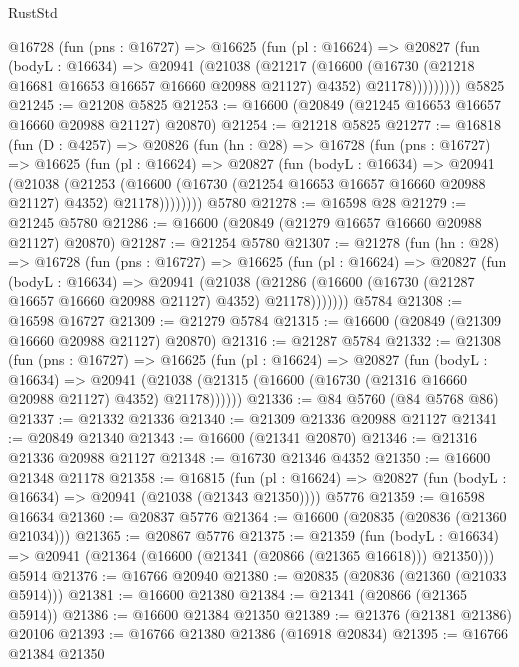 \begin{lexlean}{RustStd}
\begin{coremodule}
        @16728
          (fun (pns : @16727) =>
          @16625
            (fun (pl : @16624) =>
            @20827
              (fun (bodyL : @16634) =>
              @20941
                (@21038
                  (@21217
                    (@16600
                      (@16730 (@21218 @16681 @16653 @16657 @16660 @20988 @21127) @4352)
                      @21178)))))))))
    @5825
@21245 := @21208 @5825
@21253 := @16600 (@20849 (@21245 @16653 @16657 @16660 @20988 @21127) @20870)
@21254 := @21218 @5825
@21277 := @16818
    (fun (D : @4257) =>
    @20826
      (fun (hn : @28) =>
      @16728
        (fun (pns : @16727) =>
        @16625
          (fun (pl : @16624) =>
          @20827
            (fun (bodyL : @16634) =>
            @20941
              (@21038
                (@21253
                  (@16600 (@16730 (@21254 @16653 @16657 @16660 @20988 @21127) @4352) @21178))))))))
    @5780
@21278 := @16598 @28
@21279 := @21245 @5780
@21286 := @16600 (@20849 (@21279 @16657 @16660 @20988 @21127) @20870)
@21287 := @21254 @5780
@21307 := @21278
    (fun (hn : @28) =>
    @16728
      (fun (pns : @16727) =>
      @16625
        (fun (pl : @16624) =>
        @20827
          (fun (bodyL : @16634) =>
          @20941
            (@21038
              (@21286 (@16600 (@16730 (@21287 @16657 @16660 @20988 @21127) @4352) @21178)))))))
    @5784
@21308 := @16598 @16727
@21309 := @21279 @5784
@21315 := @16600 (@20849 (@21309 @16660 @20988 @21127) @20870)
@21316 := @21287 @5784
@21332 := @21308
    (fun (pns : @16727) =>
    @16625
      (fun (pl : @16624) =>
      @20827
        (fun (bodyL : @16634) =>
        @20941 (@21038 (@21315 (@16600 (@16730 (@21316 @16660 @20988 @21127) @4352) @21178))))))
@21336 := @84 @5760 (@84 @5768 @86)
@21337 := @21332 @21336
@21340 := @21309 @21336 @20988 @21127
@21341 := @20849 @21340
@21343 := @16600 (@21341 @20870)
@21346 := @21316 @21336 @20988 @21127
@21348 := @16730 @21346 @4352
@21350 := @16600 @21348 @21178
@21358 := @16815
    (fun (pl : @16624) => @20827 (fun (bodyL : @16634) => @20941 (@21038 (@21343 @21350))))
    @5776
@21359 := @16598 @16634
@21360 := @20837 @5776
@21364 := @16600 (@20835 (@20836 (@21360 @21034)))
@21365 := @20867 @5776
@21375 := @21359
    (fun (bodyL : @16634) => @20941 (@21364 (@16600 (@21341 (@20866 (@21365 @16618))) @21350)))
    @5914
@21376 := @16766 @20940
@21380 := @20835 (@20836 (@21360 (@21033 @5914)))
@21381 := @16600 @21380
@21384 := @21341 (@20866 (@21365 @5914))
@21386 := @16600 @21384 @21350
@21389 := @21376 (@21381 @21386) @20106
@21393 := @16766 @21380 @21386 (@16918 @20834)
@21395 := @16766 @21384 @21350

\end{coremodule}
\end{lexlean}
